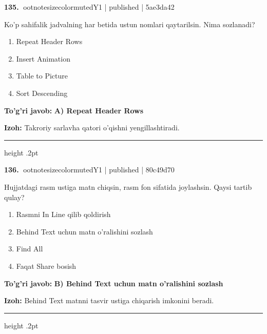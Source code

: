\documentclass[10pt,a4paper]{article}
\begin{document}
\textbf{\color{ink}135.} {ootnotesizecolor{muted}Y1 | published | 5ae3da42}
\par
Ko'p sahifalik jadvalning har betida ustun nomlari qaytarilsin. Nima sozlanadi?
\begin{enumerate}[label=\Alph*),leftmargin=9mm]
\item Repeat Header Rows
\item Insert Animation
\item Table to Picture
\item Sort Descending
\end{enumerate}
\begin{tcolorbox}[enhanced,breakable,colback=teal!4,colframe=teal!55!black,boxrule=0.45pt,arc=1.2mm,left=2.8mm,right=2.8mm,top=2mm,bottom=2mm]
\textbf{\color{teal}To'g'ri javob:} \textbf{A) Repeat Header Rows}
\par\smallskip
\textbf{Izoh:} Takroriy sarlavha qatori o'qishni yengillashtiradi.
\end{tcolorbox}
\vspace{2mm}\hrule height .2pt\vspace{2mm}

\textbf{\color{ink}136.} {ootnotesizecolor{muted}Y1 | published | 80c49d70}
\par
Hujjatdagi rasm ustiga matn chiqsin, rasm fon sifatida joylashsin. Qaysi tartib qulay?
\begin{enumerate}[label=\Alph*),leftmargin=9mm]
\item Rasmni In Line qilib qoldirish
\item Behind Text uchun matn o'ralishini sozlash
\item Find All
\item Faqat Share bosish
\end{enumerate}
\begin{tcolorbox}[enhanced,breakable,colback=teal!4,colframe=teal!55!black,boxrule=0.45pt,arc=1.2mm,left=2.8mm,right=2.8mm,top=2mm,bottom=2mm]
\textbf{\color{teal}To'g'ri javob:} \textbf{B) Behind Text uchun matn o'ralishini sozlash}
\par\smallskip
\textbf{Izoh:} Behind Text matnni tasvir ustiga chiqarish imkonini beradi.
\end{tcolorbox}
\vspace{2mm}\hrule height .2pt\vspace{2mm}
\end{document}
